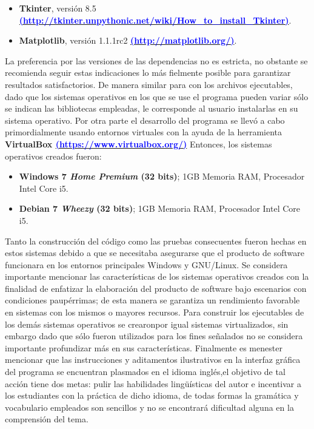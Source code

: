\documentclass[class=report, crop=false]{standalone}
\begin{document}
\begin{itemize}
\item \textbf{Tkinter}, versión 8.5 \textbf{\break\href{http://tkinter.unpythonic.net/wiki/How\_to\_install\_Tkinter}{\textcolor{blue}{(http://tkinter.unpythonic.net/wiki/How\_to\_install\_Tkinter)}}}.
\item \textbf{Matplotlib}, versión 1.1.1rc2 \textbf{\href{http://matplotlib.org/}{\textcolor{blue}{(http://matplotlib.org/)}}}.
\end{itemize}

La preferencia por las versiones de las dependencias no es 
estricta, no obstante se recomienda seguir estas indicaciones 
lo más fielmente posible para garantizar resultados satisfactorios.\break
De manera similar para con los archivos ejecutables, dado que 
los sistemas operativos en los que se use el programa pueden 
variar sólo se indican las bibliotecas empleadas, le corresponde 
al usuario instalarlas en su sistema operativo.\medskip\break
Por otra parte el desarrollo del programa se llevó a cabo 
primordialmente usando entornos virtuales con la ayuda de 
la herramienta \textbf{VirtualBox \break\href{https://www.virtualbox.org/}{\textcolor{blue}{(https://www.virtualbox.org/)}}}\break
Entonces, los sistemas operativos creados fueron:

\begin{itemize}
\item \textbf{Windows 7 \textit{Home Premium} (32 bits)}; 1GB Memoria RAM, Procesador Intel Core i5.
\item \textbf{Debian 7 \textit{Wheezy} (32 bits)}; 1GB Memoria RAM, Procesador Intel Core i5.
\end{itemize}

Tanto la construcción del código como las pruebas consecuentes 
fueron hechas en estos sistemas debido a que se necesitaba 
asegurarse que el producto de software funcionara en los entornos 
principales Windows y GNU/Linux.\medskip\break
Se considera importante mencionar las características de los 
sistemas operativos creados con la finalidad de enfatizar la 
elaboración del producto de software bajo escenarios con 
condiciones paupérrimas; de esta manera se garantiza un rendimiento 
favorable en sistemas con los mismos o mayores recursos.\medskip\break
Para construir los ejecutables de los demás sistemas operativos 
se crearonpor igual sistemas virtualizados, sin embargo dado 
que sólo fueron utilizados para los fines señalados no se 
considera importante profundizar más en sus características.\medskip\break
Finalmente es menester mencionar que las instrucciones y 
aditamentos ilustrativos en la interfaz gráfica del programa 
se encuentran plasmados en el idioma inglés,el objetivo de tal 
acción tiene dos metas: pulir las habilidades lingüísticas del 
autor e incentivar a los estudiantes con la práctica de dicho 
idioma, de todas formas la gramática y vocabulario empleados 
son sencillos y no se encontrará dificultad alguna en la comprensión 
del tema.

\end{document}
